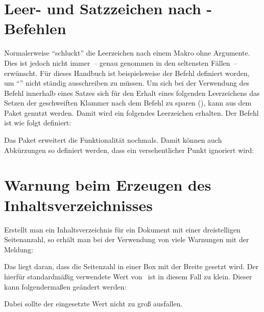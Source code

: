 \section{Leer- und Satzzeichen nach -Befehlen}%
\label{sec:tips:xspace}
Normalerweise \enquote{schluckt}  die Leerzeichen nach einem 
Makro ohne Argumente. Dies ist jedoch nicht immer~-- genau genommen in den 
seltensten Fällen~-- erwünscht. Für dieses Handbuch ist beispielsweise der 
Befehl  definiert worden, um \enquote{\TUD{}} nicht ständig 
ausschreiben zu müssen. Um sich bei der Verwendung des Befehl innerhalb eines 
Satzes sich für den Erhalt eines folgenden Leerzeichens das Setzen der 
geschweiften Klammer nach dem Befehl zu sparen (\PParameter{}), 
kann  aus dem Paket  genutzt werden. Damit wird 
ein folgendes Leerzeichen erhalten. Der Befehl  ist wie folgt 
definiert:
%
\begin{quoting}
\begin{Code}
\newcommand*\TUD{Technische Universit\"at Dresden\xspace}
\end{Code}
\end{quoting}
%
Das Paket  erweitert die Funktionalität nochmals. Damit 
können auch Abkürzungen so definiert werden, dass ein versehentlicher Punkt 
ignoriert wird:
%
\begin{quoting}
\begin{Code}
\newcommand*\zB{z.\,B\xperiod}
\end{Code}
\end{quoting}



\section{Warnung beim Erzeugen des Inhaltsverzeichnisses}
%
%
%
Erstellt man ein Inhaltsverzeichnis für ein Dokument mit einer dreistelligen 
Seitenanzahl, so erhält man bei der Verwendung von  
viele Warnungen mit der Meldung:
%
\begin{quoting}
\end{quoting}
%
Das liegt daran, dass die Seitenzahl in einer Box mit der Breite 
 gesetzt wird. Der hierfür standardmäßig verwendete Wert 
von~\PValue{1.55em} ist in diesem Fall zu klein. Dieser kann folgendermaßen 
geändert werden:
%
\begin{quoting}
\begin{Code}
\makeatletter
\renewcommand*\@pnumwidth{1.7em}
\makeatother
\end{Code}
\end{quoting}
%
Dabei sollte der eingesetzte Wert nicht zu groß ausfallen.



